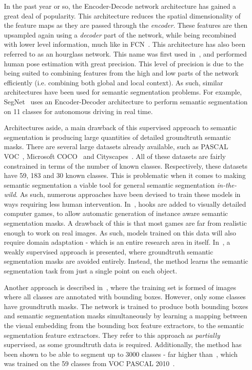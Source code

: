 In the past year or so, the Encoder-Decode network architecture has
gained a great deal of popularity. This architecture reduces the
spatial dimensionality of the feature maps as they are passed through
the \textit{encoder}. These features are then upsampled again using a
\textit{decoder} part of the network, while being recombined with
lower level information, much like in FCN~\cite{long2015fully}. This
architecture has also been referred to as an hourglass network. This
name was first used in~\cite{newell2016stacked}, and performed human
pose estimation with great precision. This level of precision is due
to the being suited to combining features from the high and low parts
of the network efficiently (i.e. combining both global and local
context). As such, similar architectures have been used for semantic
segmentation problems. For example,
SegNet~\cite{badrinarayanan2017segnet} uses an Encoder-Decoder
architecture to perform semantic segmentation on 11 classes for
autonomous driving in real time.

Architectures aside, a main drawback of this supervised approach to
semantic segmentation is producing large quantities of detailed
groundtruth semantic masks. There are several large datasets already
available, such as PASCAL VOC~\cite{everingham2010pascal}, Microsoft
COCO~\cite{lin2014microsoft} and
Cityscapes~\cite{cordts2016cityscapes}. All of these datasets are
fairly constrained in terms of the number of known
classes. Respectively, these datasets have 59, 183 and 30 known
classes. This is problematic when it comes to making semantic
segmentation a viable tool for general semantic segmentation
\textit{in-the-wild}. As such, numerous approaches have been devised
to train these models in ways requiring less human
intervention. In~\cite{richter2016playing}, hooks are added to
visually detailed computer games, to allow automatic generation of
instance aware semantic segmentation masks. A drawback of this is that
most games are far from realistic enough to work on real images. As
such, models trained on this data will also require domain adaptation
- which is an entire research area in itself. In~\cite{bearman2016s},
a weakly supervised approach is presented, where groundtruth semantic
segmentation masks are avoided entirely. Instead, the method learns
the semantic segmentation task from just a single point on each
object.

Another approach is described in~\cite{hu2018learning}, where the
training set is formed of images where all classes are annotated with
bounding boxes. However, only some classes have groundtruth masks. The
network is trained to produce both bounding boxes and semantic
segmentation masks simultaneously by learning a mapping between the
visual embedding from the bounding box feature extractors, to the
semantic segmentation feature extractors. They refer to this approach
as \textit{partially} supervised, as some groundtruth data is
required. Additionally, the method has been shown to be able to
segment up to 3000 classes - far higher than~\cite{long2015fully},
which was trained on the 59 classes from VOC PASCAL
2010~\cite{everingham2010pascal}.

